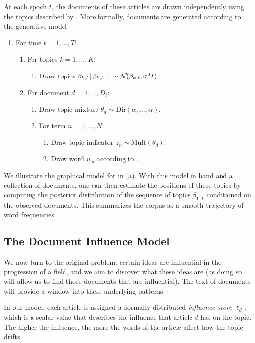 At each epoch $t$, the documents of these articles are drawn independently
using the topics described by .  More formally, documents
are generated according to the generative model
\begin{enumerate}
\item For time $t=1, \ldots, T$:
  \begin{enumerate}
  \item For topics $k=1, \ldots, K$:
    \begin{enumerate}
    \item Draw topics $\beta_{k,t} \, | \, \beta_{k,t-1} \sim \mathcal{N}(\beta_{k,t}, \sigma^2 I)$
    \end{enumerate}
  \item For document $d=1, \ldots, D_t$:
    \begin{enumerate}
    \item Draw topic mixture $\theta_d \sim \mbox{Dir}(\alpha, \ldots, \alpha)$.
    \item For term $n=1, \ldots, N$:
      \begin{enumerate}
      \item Draw topic indicator $z_n \sim \mbox{Mult}(\theta_d)$.
      \item Draw word $w_n$ according to .
      \end{enumerate}
    \end{enumerate}
  \end{enumerate}
\end{enumerate}

We illustrate the graphical model for in  (a). With this
model in hand and a collection of documents, one can then estimate the
positions of these topics by computing the posterior distribution of
the sequence of topics $\beta_{1:T}$ conditioned on the observed
documents.  This summarizes the corpus as a smooth trajectory of word
frequencies.

\subsection*{The Document Influence Model}
We now turn to the original problem: certain ideas are influential in
the progression of a field, and we aim to discover what these ideas
are (as doing so will allow us to find those documents that are
influential).  The text of documents will provide a window into these
underlying patterns.

In our model, each article is assigned a normally distributed
\textit{influence score} $\ell_d$, which is a scalar value that
describes the influence that article $d$ has on the topic.  The higher
the influence, the more the words of the article affect how the topic
drifts.

